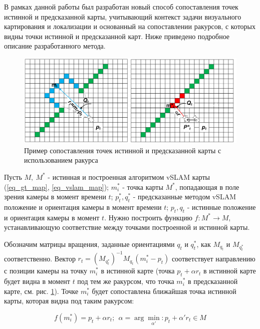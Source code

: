 \documentclass{mipt-thesis-ms}
\begin{document}
	В рамках данной работы был разработан новый способ сопоставления точек истинной и предсказанной карты, учитывающий контекст задачи визуального картирования и локализации и основанный на сопоставлении ракурсов, с которых видны точки истинной и предсказанной карт. Ниже приведено подробное описание разработанного метода.
	
	\begin{figure}
		\includegraphics[width=1.0\textwidth]{img/corresp.png}
		\caption{Пример сопоставления точек истинной и предсказанной карты с использованием ракурса}
		\label{figure_correspondences}
	\end{figure}
	
	Пусть $M,\ M^*$ - истинная и построенная алгоритмом vSLAM карты (\ref{eq_gt_map}, \ref{eq_vslam_map}); $m_i^*$ - точка карты $M^*$, попадающая в поле зрения камеры в момент времени $t$; $p_t^*, q_t^*$ - предсказанные методом vSLAM положение и ориентация камеры в момент времени $t$; $p_t, q_t$ - истинные положение и ориентация камеры в момент $t$. Нужно построить функцию $f: M^* \longrightarrow M$, устанавливающую соответствие между точками построенной и истинной карты.
	
	Обозначим матрицы вращения, заданные ориентациями $q_t$ и $q_t^*$, как $M_{q_t}$ и $M_{q_t^*}$ соответственно. Вектор $r_t = (M_{q_t^*})^{-1} M_{q_t} (m_i^* - p_t)$ соответствует направлению с позиции камеры на точку $m_i^*$ в истинной карте (точка $p_t + \alpha r_t$ в истинной карте будет видна в момент $t$ под тем же ракурсом, что точка $m_i^*$ в предсказанной карте, см. рис. \ref{figure_correspondences}). Точке $m_i^*$ будет сопоставлена ближайшая точка истинной карты, которая видна под таким ракурсом:
	
	\begin{equation}
	\label{eq_corresp_function}
	f(m_i^*) = p_t + \alpha r_t;\ \ \alpha = \arg\min \limits_{\alpha'}: p_t + \alpha' r_t \in M
	\end{equation}
	
\end{document}
